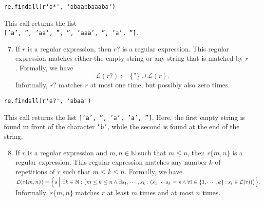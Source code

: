 \begin{verbatim}
re.findall(r'a*', 'abaabbaaaba')
\end{verbatim}

\noindent
This call returns the list
\\[0.2cm]
\hspace*{1.3cm}
\texttt{['a', '', 'aa', '', '', 'aaa', '', 'a', '']}.

\begin{enumerate}
\setcounter{enumi}{6}
\item If $r$ is a regular expression, then $r\texttt{?}$ is a regular expression.  This regular expression
      matches either the empty string or any string that is matched by $r$.  Formally, we have
      $$\mathcal{L}(r\texttt{?}) := \bigl\{ \texttt{''} \bigr\} \cup \mathcal{L}(r).$$
      Informally, $r\texttt{?}$ matches $r$ at most one time, but possibly also zero times.
\end{enumerate}

\begin{verbatim}
re.findall(r'a?', 'abaa')
\end{verbatim}

\noindent
This call returns the list \texttt{['a', '', 'a', 'a', '']}.  Here, the first empty string is found in front of
the character \texttt{'b'}, while the second is found at the end of the string.

\begin{enumerate}
\setcounter{enumi}{7}
\item If $r$ is a regular expression and $m,n\in\mathbb{N}$ such that $m \leq n$, then $r\texttt{\{}m,n\texttt{\}}$
      is a regular expression.  This regular expression matches any number $k$ of repetitions of $r$ such that
      $m \leq k \leq n$.  Formally, we have
\\[0.2cm]
\hspace*{-1.3cm}
      $\displaystyle \mathcal{L}(r\texttt{\{}m,n\texttt{\}}) =
        \Bigl\{ s \Bigm| \exists k \in \mathbb{N}: \bigl(m \leq k \leq n \wedge 
                \exists s_1,\cdots,s_k : (s_1 \cdots s_k = s \wedge 
                 \forall i \in \{1,\cdots, k\}:  s_i \in \mathcal{L}(r))\bigr)  
        \Bigr\}.
      $
      \\[0.2cm]
      Informally, $r\texttt{\{}m,n\texttt{\}}$ matches $r$ at least $m$ times and at most $n$ times.
\end{enumerate}

